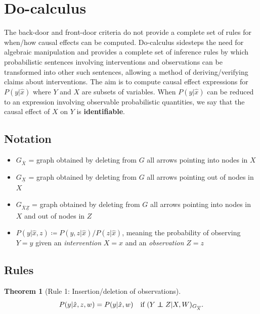 \documentclass[11pt]{article}
\numberwithin{equation}{section}
\newcommand\indep{\protect\mathpalette{\protect\independenT}{\perp}}
\def\independenT#1#2{\mathrel{\rlap{$#1#2$}\mkern2mu{#1#2}}}
\newcommand{\defeq}{\coloneqq}
\newtheorem{thm}{Theorem}[section]
\begin{document}
\section{Do-calculus} \label{sec:do-calc}

The back-door and front-door criteria do not provide a complete set of rules for when/how causal effects can be computed. Do-calculus sidesteps the need for algebraic manipulation and provides a complete set of inference rules by which probabilistic sentences involving interventions and observations can be transformed into other such sentences, allowing a method of deriving/verifying claims about interventions. The aim is to compute causal effect expressions for $P(y|\hat{x})$ where $Y$ and $X$ are subsets of variables. When $P(y|\hat{x})$ can be reduced to an expression involving observable probabilistic quantities, we say that the causal effect of $X$ on $Y$ is \textbf{identifiable}.

\subsection{Notation}
\begin{itemize}[noitemsep]
\item $G_{\overline{X}}$ = graph obtained by deleting from $G$ all arrows pointing into nodes in $X$
\item $G_{\underline{X}}$ = graph obtained by deleting from $G$ all arrows pointing out of nodes in $X$
\item $G_{\overline{X}\underline{Z}}$ = graph obtained by deleting from $G$ all arrows pointing into nodes in $X$ and out of nodes in $Z$
\item $P(y|\hat{x},z) \defeq P(y,z|\hat{x}) / P(z|\hat{x})$, meaning the probability of observing $Y=y$ given an \textit{intervention} $X=x$ and an \textit{observation} $Z=z$
\end{itemize}

\subsection{Rules} \label{sec:Rules}

\begin{thm}[Rule 1: Insertion/deletion of observations] 
\begin{equation}
P(y|\hat{x}, z, w) = P(y| \hat{x}, w) \quad \text{if}\ (Y \indep Z|X,W)_{G_{{\overline{X}}}}.
\end{equation} \label{thm:do-calc-ins-del-obs}
\end{thm}
\end{document}
